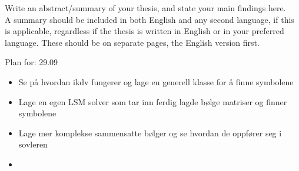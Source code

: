 
Write an abstract/summary of your thesis, and state your main findings here. \\

\noindent A summary should be included in both English and any second language, if this is applicable, regardless if the thesis is written in English or in your preferred language. These should be on separate pages, the English version first.


\noindent Plan for: 29.09
\begin{itemize}
    \item Se på hvordan ikdv fungerer og lage en generell klasse for å finne symbolene
    \item Lage en egen LSM solver som tar inn ferdig lagde bølge matriser og finner symbolene
    \item Lage mer komplekse sammensatte bølger og se hvordan de oppfører seg i sovleren
    \item 
\end{itemize}